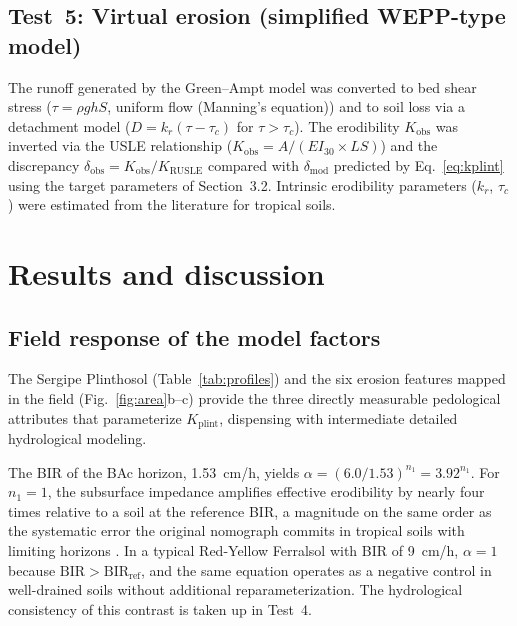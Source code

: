 \documentclass[preprint,review,12pt,authoryear]{elsarticle}
\begin{document}
\subsection{Test~5: Virtual erosion (simplified WEPP-type model)}

The runoff generated by the Green--Ampt model was converted to bed shear stress ($\tau = \rho g h S$, uniform flow (Manning's equation)) and to soil loss via a detachment model ($D = k_r(\tau - \tau_c)$ for $\tau > \tau_c$). The erodibility $K_{\mathrm{obs}}$ was inverted via the USLE relationship ($K_{\mathrm{obs}} = A/(EI_{30} \times LS)$) and the discrepancy $\delta_{\mathrm{obs}} = K_{\mathrm{obs}}/K_{\mathrm{RUSLE}}$ compared with $\delta_{\mathrm{mod}}$ predicted by Eq.~\ref{eq:kplint} using the target parameters of Section~3.2. Intrinsic erodibility parameters ($k_r$, $\tau_c$) were estimated from the literature for tropical soils.

\section{Results and discussion}
\label{sec:results}

\subsection{Field response of the model factors}

The Sergipe Plinthosol (Table~\ref{tab:profiles}) and the six erosion features mapped in the field (Fig.~\ref{fig:area}b--c) provide the three directly measurable pedological attributes that parameterize $K_{\mathrm{plint}}$, dispensing with intermediate detailed hydrological modeling.

The BIR of the BAc horizon, 1.53~cm/h, yields $\alpha = (6.0/1.53)^{n_1} = 3.92^{n_1}$. For $n_1 = 1$, the subsurface impedance amplifies effective erodibility by nearly four times relative to a soil at the reference BIR, a magnitude on the same order as the systematic error the original nomograph commits in tropical soils with limiting horizons \citep{alewell_et_al_2019}. In a typical Red-Yellow Ferralsol with BIR of 9~cm/h, $\alpha = 1$ because $\mathrm{BIR} > \mathrm{BIR_{ref}}$, and the same equation operates as a negative control in well-drained soils without additional reparameterization. The hydrological consistency of this contrast is taken up in Test~4.
\end{document}
